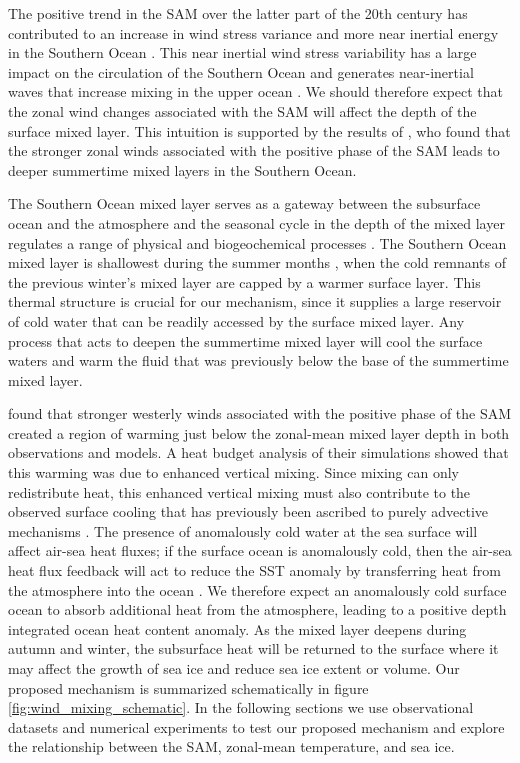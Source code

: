 \documentclass{ametsocV5}
\begin{document}
The positive trend in the SAM over the latter part of the 20th century \citep{Jones2016} has contributed to an increase in wind stress variance and more near inertial energy in the Southern Ocean \citep{Rath2014}. This near inertial wind stress variability has a large impact on the circulation of the Southern Ocean \citep{Munday2017} and generates near-inertial waves that increase mixing in the upper ocean \citep{Furuichi2008,Rath2014,Song2019,Zhai2009}. We should therefore expect that the zonal wind changes associated with the SAM will affect the depth of the surface mixed layer. This intuition is supported by the results of \citet{Panassa2018}, who found that the stronger zonal winds associated with the positive phase of the SAM leads to deeper summertime mixed layers in the Southern Ocean.

The Southern Ocean mixed layer serves as a gateway between the subsurface ocean and the atmosphere \citep{Klocker2018,Marshall1997a} and the seasonal cycle in the depth of the mixed layer regulates a range of physical and biogeochemical processes \citep{Doney2004,Williams2017}. The Southern Ocean mixed layer is shallowest during the summer months \citep{Holte2017}, when the cold remnants of the previous winter's mixed layer are capped by a warmer surface layer. This thermal structure is crucial for our mechanism, since it supplies a large reservoir of cold water that can be readily accessed by the surface mixed layer. Any process that acts to deepen the summertime mixed layer will cool the surface waters and warm the fluid that was previously below the base of the summertime mixed layer.

\citet{Doddridge2019a} found that stronger westerly winds associated with the positive phase of the SAM created a region of warming just below the zonal-mean mixed layer depth in both observations and models. A heat budget analysis of their simulations showed that this warming was due to enhanced vertical mixing. Since mixing can only redistribute heat, this enhanced vertical mixing must also contribute to the observed surface cooling that has previously been ascribed to purely advective mechanisms \citep{Ferreira2015,Purich2016}. The presence of anomalously cold water at the sea surface will affect air-sea heat fluxes; if the surface ocean is anomalously cold, then the air-sea heat flux feedback will act to reduce the SST anomaly by transferring heat from the atmosphere into the ocean \citep{Hausmann2017a}. We therefore expect an anomalously cold surface ocean to absorb additional heat from the atmosphere, leading to a positive depth integrated ocean heat content anomaly. As the mixed layer deepens during autumn and winter, the subsurface heat will be returned to the surface where it may affect the growth of sea ice and reduce sea ice extent or volume. Our proposed mechanism is summarized schematically in figure \ref{fig:wind_mixing_schematic}. In the following sections we use observational datasets and numerical experiments to test our proposed mechanism and explore the relationship between the SAM, zonal-mean temperature, and sea ice.
\end{document}
